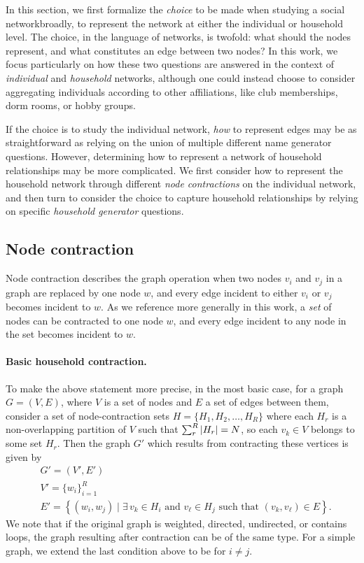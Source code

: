 In this section, we first formalize the \textit{choice} to be made when studying a social network\textemdash broadly, to represent the network at either the individual or household level. The choice, in the language of networks, is twofold: what should the nodes represent, and what constitutes an edge between two nodes? In this work, we focus particularly on how these two questions are answered in the context of \textit{individual} and \textit{household} networks, although one could instead choose to consider aggregating individuals according to other affiliations, like club memberships, dorm rooms, or hobby groups. 

If the choice is to study the individual network, \textit{how} to represent edges may be as straightforward as relying on the union of multiple different name generator questions. However, determining how to represent a network of household relationships may be more complicated. We first consider how to represent the household network through different \textit{node contractions} on the individual network, and then turn to consider the choice to capture household relationships by relying on specific \textit{household generator} questions.

\subsection{Node contraction} \label{subsubsec:cont_rules}
Node contraction \citep{oxley2006matroid, bollobas2013modern} describes the graph operation when two nodes $v_i$ and $v_j$ in a graph are replaced by one node $w$, and every edge incident to either $v_i$ or $v_j$ becomes incident to $w$. As we reference more generally in this work, a \textit{set} of nodes can be contracted to one node $w$, and every edge incident to any node in the set becomes incident to $w$. 

\paragraph{Basic household contraction.} To make the above statement more precise, in the most basic case, for a graph $G = (V, E)$, where $V$ is a set of nodes and $E$ a set of edges between them, consider a set of node-contraction sets $H=\{H_1, H_2, \dots, H_R \}$ where each $H_r$ is a non-overlapping partition of $V$ such that $\sum_{r}^{R} \left|H_r\right|  = N$, so each $v_k \in V$ belongs to some set $H_r$. Then the graph $G'$ which results from contracting these vertices is given by
\begin{equation} \label{eq:contraction}
    \begin{aligned}
    &G' = (V', E')\\
    &V' = \{ w_i \}_{i=1}^{R} \\
    &E' = \left\{ (w_i, w_j) \mid \exists \, v_k \in H_i \textrm{ and } v_\ell \in H_j \textrm{ such that } (v_k, v_\ell) \in E \right\}.
    \end{aligned}
\end{equation}
We note that if the original graph is weighted, directed, undirected, or contains loops, the graph resulting after contraction can be of the same type. For a simple graph, we extend the last condition above to be for $i \neq j$. 

